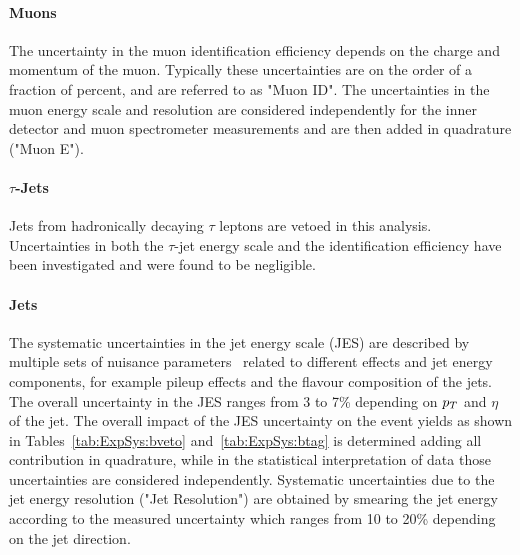 \paragraph{Muons}
The uncertainty in the  muon identification efficiency depends on the charge and momentum of the muon.
Typically these uncertainties are on the order of a fraction of percent, and are referred to as "Muon ID". 
The uncertainties in the muon energy scale and resolution are considered independently for the inner detector 
and muon spectrometer measurements and are then  added in quadrature ("Muon E").

\paragraph{$\tau$-Jets}
Jets from  hadronically decaying $\tau$ leptons are vetoed in this analysis. Uncertainties in both the $\tau$-jet energy scale 
and the identification efficiency have been investigated and were found to be negligible.

\paragraph{Jets}
The systematic uncertainties in the jet energy scale (JES) are described by multiple sets of nuisance parameters~\cite{JES}
related to different effects and jet energy components, for example  pileup effects and the flavour composition of the jets. 
The overall uncertainty in the JES ranges from  3 to 7\% depending on $p_{T}$ and $\eta$ of the jet. 
The overall impact of the JES uncertainty on the event yields as shown in Tables~\ref{tab:ExpSys:bveto} and~\ref{tab:ExpSys:btag}
is determined adding all contribution in quadrature, while in the statistical interpretation of data
those uncertainties are considered independently.
Systematic uncertainties due to the jet energy resolution ("Jet Resolution") are obtained by smearing the jet energy 
according to the measured  uncertainty which ranges from 10 to 20\% depending on the jet direction.

